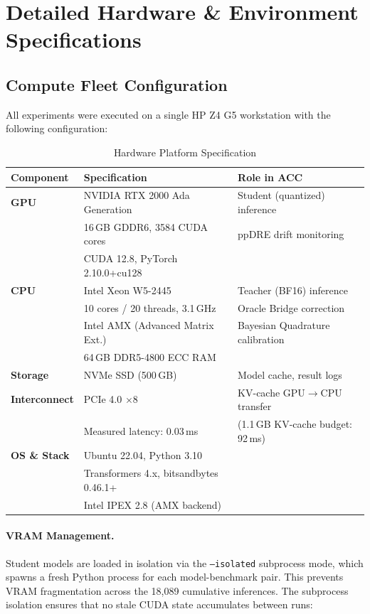 \documentclass[twoside]{article}
\begin{document}
\section{Detailed Hardware \& Environment Specifications}
\label{app:hardware}

\subsection{Compute Fleet Configuration}
\label{app:compute}

All experiments were executed on a single HP Z4 G5 workstation with the following configuration:

\begin{table}[H]
\centering
\caption{Hardware Platform Specification}
\label{tab:hardware}
\begin{tabular}{@{}lll@{}}
\toprule
\textbf{Component} & \textbf{Specification} & \textbf{Role in ACC} \\
\midrule
\textbf{GPU} & NVIDIA RTX 2000 Ada Generation & Student (quantized) inference \\
 & 16\,GB GDDR6, 3584 CUDA cores & ppDRE drift monitoring \\
 & CUDA 12.8, PyTorch 2.10.0+cu128 & \\
\midrule
\textbf{CPU} & Intel Xeon W5-2445 & Teacher (BF16) inference \\
 & 10 cores / 20 threads, 3.1\,GHz & Oracle Bridge correction \\
 & Intel AMX (Advanced Matrix Ext.) & Bayesian Quadrature calibration \\
 & 64\,GB DDR5-4800 ECC RAM & \\
\midrule
\textbf{Storage} & NVMe SSD (500\,GB) & Model cache, result logs \\
\midrule
\textbf{Interconnect} & PCIe 4.0 $\times$8 & KV-cache GPU$\to$CPU transfer \\
 & Measured latency: 0.03\,ms & (1.1\,GB KV-cache budget: 92\,ms) \\
\midrule
\textbf{OS \& Stack} & Ubuntu 22.04, Python 3.10 & \\
 & Transformers 4.x, bitsandbytes 0.46.1+ & \\
 & Intel IPEX 2.8 (AMX backend) & \\
\bottomrule
\end{tabular}
\end{table}

\paragraph{VRAM Management.} Student models are loaded in isolation via the \texttt{--isolated} subprocess mode, which spawns a fresh Python process for each model-benchmark pair. This prevents VRAM fragmentation across the 18,089 cumulative inferences. The subprocess isolation ensures that no stale CUDA state accumulates between runs:
\end{document}
